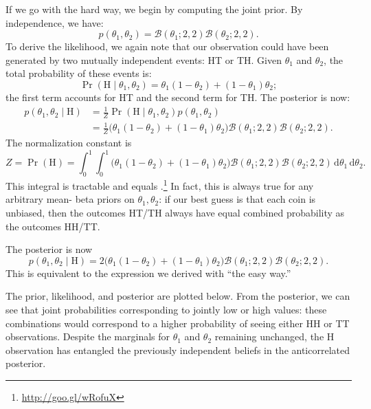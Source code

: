\documentclass{article}
\newcommand{\given}{\mid}
\newcommand{\mc}[1]{\mathcal{#1}}
\newcommand{\intd}[1]{\,\mathrm{d}{#1}}
\begin{document}
If we go with the hard way, we begin by computing the joint prior.  By
independence, we have:
\begin{equation*}
  p(\theta_1, \theta_2)
  =
  \mc{B}(\theta_1; 2, 2)
  \mc{B}(\theta_2; 2, 2).
\end{equation*}
To derive the likelihood, we again note that our observation could
have been generated by two mutually independent events: HT or TH.
Given $\theta_1$ and $\theta_2$, the total probability of these
events is:
\begin{equation*}
  \Pr(\text{H} \given \theta_1, \theta_2)
  =
  \theta_1(1 - \theta_2)
  +
  (1 - \theta_1)\theta_2;
\end{equation*}
the first term accounts for HT and the second term for TH.  The
posterior is now:
\begin{align*}
  p(\theta_1, \theta_2 \given \text{H})
  &=
  \tfrac{1}{Z}
  \Pr(\text{H} \given \theta_1, \theta_2)
  p(\theta_1, \theta_2)
  \\
  &=
  \tfrac{1}{Z}
  \bigl(
  \theta_1(1 - \theta_2)
  +
  (1 - \theta_1)\theta_2
  \bigr)
  \mc{B}(\theta_1; 2, 2)
  \mc{B}(\theta_2; 2, 2).
\end{align*}
The normalization constant is
\begin{equation*}
  Z
  =
  \Pr(\text{H})
  =
  \int_0^1
  \int_0^1
  \bigl(
  \theta_1(1 - \theta_2)
  +
  (1 - \theta_1)\theta_2
  \bigr)
  \mc{B}(\theta_1; 2, 2)
  \mc{B}(\theta_2; 2, 2)
  \intd{\theta_1}
  \intd{\theta_2}.
\end{equation*}
This integral is tractable and equals
.\footnote{\url{http://goo.gl/wRofuX}} In fact, this is
always true for any arbitrary mean- beta priors on
$\theta_1, \theta_2$: if our best guess is that each coin is unbiased,
then the outcomes HT/TH always have equal combined probability as the
outcomes HH/TT.

The posterior is now
\begin{equation*}
  p(\theta_1, \theta_2 \given \text{H})
  =
  2
  \bigl(
  \theta_1(1 - \theta_2)
  +
  (1 - \theta_1)\theta_2
  \bigr)
  \mc{B}(\theta_1; 2, 2)
  \mc{B}(\theta_2; 2, 2).
\end{equation*}
This is equivalent to the expression we derived with ``the easy way.''

The prior, likelihood, and posterior are plotted below.  From the
posterior, we can see that joint probabilities corresponding to
jointly low or high values: these combinations would correspond to a
higher probability of seeing either HH or TT observations.  Despite
the marginals for $\theta_1$ and $\theta_2$ remaining unchanged, the H
observation has entangled the previously independent beliefs in the
anticorrelated posterior.
\end{document}
